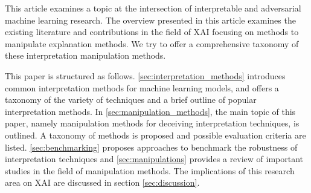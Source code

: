 


\newline
This article examines a topic at the intersection of interpretable and adversarial machine learning research. 
The overview presented in this article examines the existing literature and contributions in the field of XAI focusing on methods to manipulate explanation methods. We try to offer a comprehensive taxonomy of these interpretation manipulation methods. 

This paper is structured as follows. \autoref{sec:interpretation_methods} introduces common interpretation methods for machine learning models, and offers a taxonomy of the variety of techniques and a brief outline of popular interpretation methods.
In \autoref{sec:manipulation_methods}, the main topic of this paper, namely manipulation methods for deceiving interpretation techniques, is outlined. A taxonomy of methods is proposed and possible evaluation criteria are listed. \autoref{sec:benchmarking} proposes approaches to benchmark the robustness of interpretation techniques and \autoref{sec:manipulations} provides a review of important studies in the field of manipulation methods. The implications of this research area on XAI are discussed in section \autoref{sec:discussion}.
